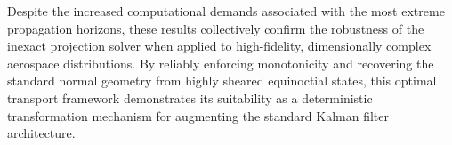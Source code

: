 Despite the increased computational demands associated with the most extreme propagation horizons, these results collectively confirm the robustness of the inexact projection solver when applied to high-fidelity, dimensionally complex aerospace distributions. By reliably enforcing monotonicity and recovering the standard normal geometry from highly sheared equinoctial states, this optimal transport framework demonstrates its suitability as a deterministic transformation mechanism for augmenting the standard Kalman filter architecture.